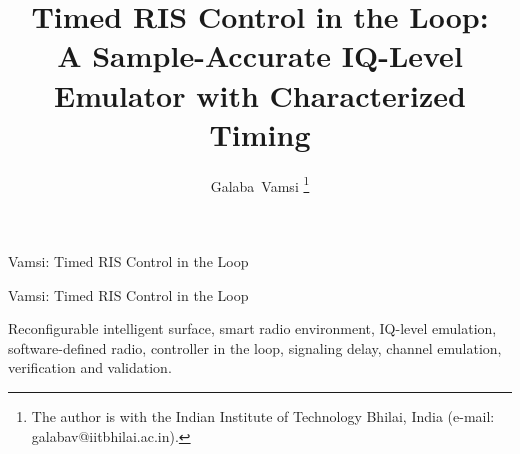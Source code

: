 \documentclass[journal]{IEEEtran}
\begin{document}
\title{Timed RIS Control in the Loop:\\
A Sample-Accurate IQ-Level Emulator with Characterized Timing}

\author{Galaba~Vamsi%
\thanks{The author is with the Indian Institute of Technology Bhilai, India
(e-mail: galabav@iitbhilai.ac.in).}}

\ifsremudraft
           {Vamsi: Timed RIS Control in the Loop}
\else
           {Vamsi: Timed RIS Control in the Loop}
\fi

\maketitle



\begin{IEEEkeywords}
Reconfigurable intelligent surface, smart radio environment, IQ-level emulation,
software-defined radio, controller in the loop, signaling delay, channel emulation,
verification and validation.
\end{IEEEkeywords}

















\appendices







\end{document}
